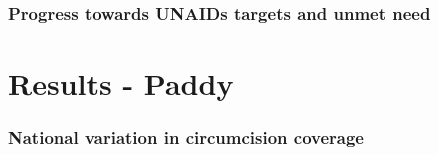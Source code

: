 \documentclass{article}
\begin{document}

\subsubsection*{Progress towards UNAIDs targets and unmet need}











\section*{Results - Paddy}


\subsubsection*{National variation in circumcision coverage}


\end{document}
